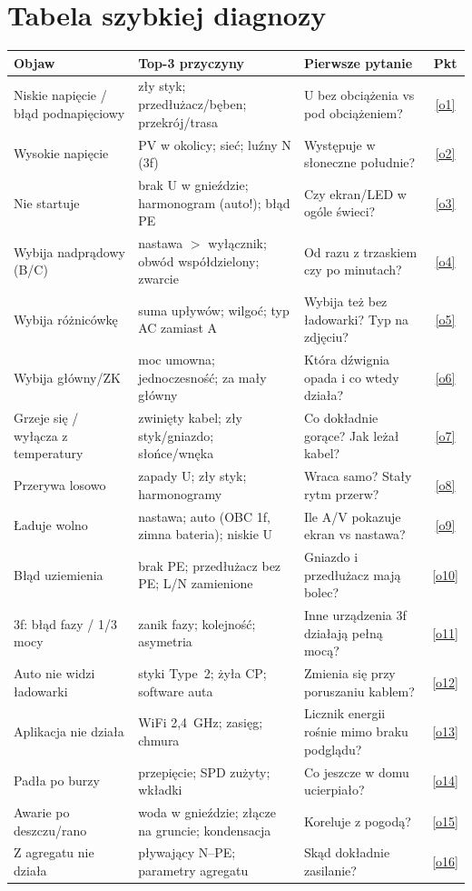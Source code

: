 \documentclass[11pt]{article}
\begin{document}
\section{Tabela szybkiej diagnozy}\label{sec:szybka}
{\small
\begin{tabularx}{\textwidth}{@{}p{3.5cm}p{4.6cm}Yc@{}}
\toprule
\textbf{\sffamily Objaw} & \textbf{\sffamily Top-3 przyczyny} & \textbf{\sffamily Pierwsze pytanie} & \textbf{\sffamily Pkt}\\
\midrule
Niskie napięcie / błąd podnapięciowy & zły styk; przedłużacz/bęben; przekrój/trasa & U bez obciążenia vs pod obciążeniem? & \ref{o1}\\
\addlinespace[2pt]
Wysokie napięcie & PV w okolicy; sieć; luźny N (3f) & Występuje w słoneczne południe? & \ref{o2}\\
\addlinespace[2pt]
Nie startuje & brak U w gnieździe; harmonogram (auto!); błąd PE & Czy ekran/LED w ogóle świeci? & \ref{o3}\\
\addlinespace[2pt]
Wybija nadprądowy (B/C) & nastawa $>$ wyłącznik; obwód współdzielony; zwarcie & Od razu z trzaskiem czy po minutach? & \ref{o4}\\
\addlinespace[2pt]
Wybija różnicówkę & suma upływów; wilgoć; typ AC zamiast A & Wybija też bez ładowarki? Typ na zdjęciu? & \ref{o5}\\
\addlinespace[2pt]
Wybija główny/ZK & moc umowna; jednoczesność; za mały główny & Która dźwignia opada i co wtedy działa? & \ref{o6}\\
\addlinespace[2pt]
Grzeje się / wyłącza z temperatury & zwinięty kabel; zły styk/gniazdo; słońce/wnęka & Co dokładnie gorące? Jak leżał kabel? & \ref{o7}\\
\addlinespace[2pt]
Przerywa losowo & zapady U; zły styk; harmonogramy & Wraca samo? Stały rytm przerw? & \ref{o8}\\
\addlinespace[2pt]
Ładuje wolno & nastawa; auto (OBC 1f, zimna bateria); niskie U & Ile A/V pokazuje ekran vs nastawa? & \ref{o9}\\
\addlinespace[2pt]
Błąd uziemienia & brak PE; przedłużacz bez PE; L/N zamienione & Gniazdo i przedłużacz mają bolec? & \ref{o10}\\
\addlinespace[2pt]
3f: błąd fazy / 1/3 mocy & zanik fazy; kolejność; asymetria & Inne urządzenia 3f działają pełną mocą? & \ref{o11}\\
\addlinespace[2pt]
Auto nie widzi ładowarki & styki Type~2; żyła CP; software auta & Zmienia się przy poruszaniu kablem? & \ref{o12}\\
\addlinespace[2pt]
Aplikacja nie działa & WiFi 2,4~GHz; zasięg; chmura & Licznik energii rośnie mimo braku podglądu? & \ref{o13}\\
\addlinespace[2pt]
Padła po burzy & przepięcie; SPD zużyty; wkładki & Co jeszcze w domu ucierpiało? & \ref{o14}\\
\addlinespace[2pt]
Awarie po deszczu/rano & woda w gnieździe; złącze na gruncie; kondensacja & Koreluje z pogodą? & \ref{o15}\\
\addlinespace[2pt]
Z agregatu nie działa & pływający N--PE; parametry agregatu & Skąd dokładnie zasilanie? & \ref{o16}\\
\bottomrule
\end{tabularx}
}
\end{document}
